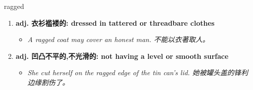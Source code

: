 
\begin{frame}
{\huge ragged}
\begin{center}
\begin{enumerate}\Large
  \item \textbf{adj. 衣衫褴褛的: dressed in tattered or threadbare clothes}
  \begin{itemize}
    \item \em{\Large{A ragged coat may cover an honest man. 不能以衣著取人。}}
  \end{itemize}
  \item \textbf{adj. 凹凸不平的,不光滑的: not having a level or smooth surface}
  \begin{itemize}
    \item \em{\Large{She cut herself on the ragged edge of the tin can's lid. 她被罐头盖的锋利边缘割伤了。}}
  \end{itemize}
\end{enumerate}
\end{center}
\end{frame}
